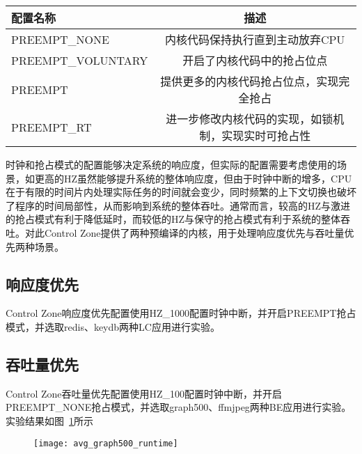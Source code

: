 \begin{table}
    \label{tab:config_preempt}
    \footnotesize%
    \setlength{\tabcolsep}{4pt}%
    \renewcommand{\arraystretch}{1.5}%
    \centering
    \begin{tabular}{lc}
        \hline
        配置名称 & 描述 \\
        \hline
        PREEMPT_NONE  & 内核代码保持执行直到主动放弃CPU  \\
        PREEMPT_VOLUNTARY  & 开启了内核代码中的抢占位点 \\
        PREEMPT  & 提供更多的内核代码抢占位点，实现完全抢占 \\
        PREEMPT_RT & 进一步修改内核代码的实现，如锁机制，实现实时可抢占性 \\
        \hline
    \end{tabular}
\end{table}

时钟和抢占模式的配置能够决定系统的响应度，但实际的配置需要考虑使用的场景，如更高的HZ虽然能够提升系统的整体响应度，但由于时钟中断的增多，CPU在于有限的时间片内处理实际任务的时间就会变少，同时频繁的上下文切换也破坏了程序的时间局部性，从而影响到系统的整体吞吐。通常而言，较高的HZ与激进的抢占模式有利于降低延时，而较低的HZ与保守的抢占模式有利于系统的整体吞吐。对此Control Zone提供了两种预编译的内核，用于处理响应度优先与吞吐量优先两种场景。


\subsection{响应度优先}


Control Zone响应度优先配置使用HZ_1000配置时钟中断，并开启PREEMPT抢占模式，并选取redis、keydb两种LC应用进行实验。


\subsection{吞吐量优先}


Control Zone吞吐量优先配置使用HZ_100配置时钟中断，并开启PREEMPT_NONE抢占模式，并选取graph500、ffmjpeg两种BE应用进行实验。实验结果如图~\ref{fig:avg_graph500_runtime}所示

\begin{figure}[!htbp]
    \centering
    \texttt{[image: avg\_graph500\_runtime]}
    \label{fig:avg_graph500_runtime}
\end{figure}



